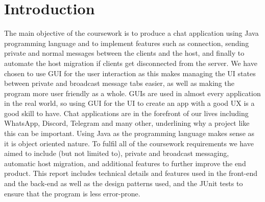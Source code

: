 \documentclass{COMPXXXX}
\begin{document}
\section{Introduction}
\normalsize \textrm {The main objective of the coursework is to produce a chat application using Java programming language and to implement features such as connection, sending private and normal messages between the clients and the host, and finally to automate the host migration if clients get disconnected from the server. We have chosen to use GUI for the user interaction as this makes managing the UI states between private and broadcast message tabs easier, as well as making the program more user friendly as a whole. GUIs are used in almost every application in the real world, so using GUI for the UI to create an app with a good UX is a good skill to have. Chat applications are in the forefront of our lives including WhatsApp, Discord, Telegram and many other, underlining why a project like this can be important. Using Java as the programming language makes sense as it is object oriented nature. To fulfil all of the coursework requirements we have aimed to include (but not limited to), private and broadcast messaging, automatic host migration, and additional features to further improve the end product. This report includes technical details and features used in the front-end and the back-end as well as the design patterns used, and the JUnit tests to ensure that the program is less error-prone.}
\end{document}
